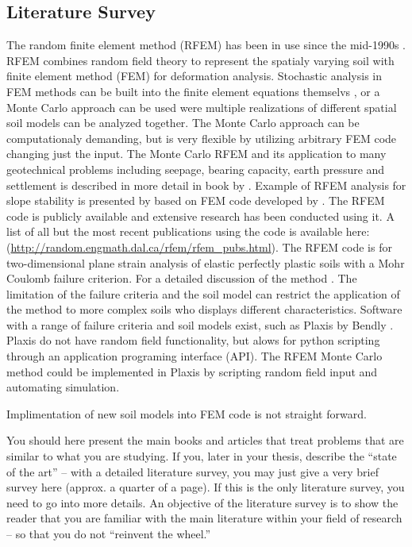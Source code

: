 \subsection*{Literature Survey}
The random finite element method (RFEM) has been in use since the mid-1990s \citep*[e.g, see][]{griffiths1993seepage}. RFEM combines random field theory to represent the spatialy varying soil with finite element method (FEM) for deformation analysis. Stochastic analysis in FEM methods can be built into the finite element equations themselvs \citep*[e.g., see][]{vanmarcke1983stochastic}, 
or a Monte Carlo approach can be used were multiple realizations of different spatial soil models can be analyzed together. The Monte Carlo approach can be computationaly demanding, but is very flexible by utilizing arbitrary FEM code changing just the input. The Monte Carlo RFEM and its application to many geotechnical problems including seepage, bearing capacity, earth pressure and settlement is described in more detail in book by \citet*{fenton2008risk}.
Example of RFEM analysis for slope stability is presented by \citep*[see][Chapter 13]{fenton2008risk} based on FEM code developed by \citep{smith2013programming}. The RFEM code is publicly available and extensive research has been conducted using it. A list of all but the most recent publications using the code is available here: (\url{http://random.engmath.dal.ca/rfem/rfem_pubs.html}). 
The RFEM code is for two-dimensional plane strain analysis of elastic perfectly plastic soils with a Mohr Coulomb failure criterion. For a detailed discussion of the method \citep*[e.g, see][]{griffiths1999slope}.
The limitation of the failure criteria and the soil model can restrict the application of the method to more complex soils who displays different characteristics. Software with a range of failure criteria and soil models exist, such as Plaxis by Bendly \citep{brinkgreve2010plaxis}. Plaxis do not have random field functionality, but alows for python scripting through an application programing interface (API). 
The RFEM Monte Carlo method could be implemented in Plaxis by scripting random field input and automating simulation.


Implimentation of new soil models into FEM code is not straight forward.




You should here present the main books and articles that treat problems that are similar to what  you are studying. If you,  later in your thesis, describe the ``state of the art'' -- with a detailed literature survey, you may just give a very brief survey here (approx. a quarter of a page). If this is the only literature survey, you need to go into more details. An objective of the literature survey is to show the reader that you are familiar with the main literature within your field of research -- so that you do not ``reinvent the wheel.''


